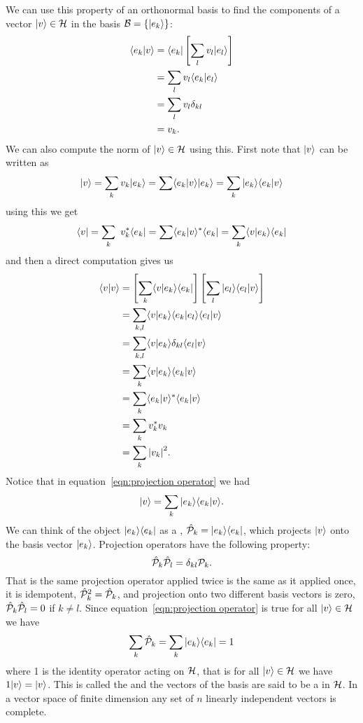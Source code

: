     We can use this property of an orthonormal basis to find the components of a vector \(\vert {v} \rangle\in\mathcal{H}\) in the basis \(\mathcal{B} = \{\vert {e_k} \rangle\}\):
    \begin{align*}
        \langle {e_k} \vert {v} \rangle &= \langle {e_k} \vert\left[\sum_l v_l\vert {e_l} \rangle\right]\\
        &= \sum_l v_l\langle {e_k} \vert {e_l} \rangle\\
        &= \sum_l v_l\delta_{kl}\\
        &= v_k.
    \end{align*}
    We can also compute the norm of \(\vert {v} \rangle\in\mathcal{H}\) using this.
    First note that \(\vert {v} \rangle\) can be written as
    \begin{equation}\label{eqn:projection operator}
        \vert {v} \rangle = \sum_k v_k \vert {e_k} \rangle = \sum \langle {e_k} \vert {v} \rangle\vert {e_k} \rangle = \sum_k \vert {e_k} \rangle\langle {e_k} \vert {v} \rangle
    \end{equation}
    using this we get
    \[\langle {v} \vert = \sum_k\ v_k^*\langle {e_k} \vert = \sum \langle {e_k} \vert {v} \rangle^*\langle {e_k} \vert = \sum_k \langle {v} \vert {e_k} \rangle\langle {e_k} \vert\]
    and then a direct computation gives us
    \begin{align*}
        \langle {v} \vert {v} \rangle &= \left[\sum_k \langle {v} \vert {e_k} \rangle\langle {e_k} \vert\right]\left[\sum_l \vert {e_l} \rangle\langle {e_l} \vert {v} \rangle\right]\\
        &= \sum_{k, l}\langle {v} \vert {e_k} \rangle\langle {e_k} \vert {e_l} \rangle\langle {e_l} \vert {v} \rangle\\
        &= \sum_{k, l}\langle {v} \vert {e_k} \rangle\delta_{kl}\langle {e_l} \vert {v} \rangle\\
        &= \sum_k \langle {v} \vert {e_k} \rangle\langle {e_k} \vert {v} \rangle\\
        &= \sum_k \langle {e_k} \vert {v} \rangle^*\langle {e_k} \vert {v} \rangle\\
        &= \sum_k v_k^*v_k\\
        &= \sum_k \abs{v_k}^2.
    \end{align*}
    Notice that in equation~\ref{eqn:projection operator} we had
    \[\vert {v} \rangle = \sum_k\vert {e_k} \rangle\langle {e_k} \vert {v} \rangle.\]
    We can think of the object \(\vert {e_k}\rangle\langle {e_k} \vert\) as a , \(\hat{\mathcal{P}}_k = \vert {e_k}\rangle\langle {e_k} \vert\), which projects \(\vert {v} \rangle\) onto the basis vector \(\vert {e_k} \rangle\).
    Projection operators have the following property:
    \[\hat{\mathcal{P}}_k\hat{\mathcal{P}}_l = \delta_{kl}\mathcal{P}_k.\]
    That is the same projection operator applied twice is the same as it applied once, it is idempotent, \(\hat{\mathcal{P}}_k^2 = \hat{\mathcal{P}}_k\), and projection onto two different basis vectors is zero, \(\hat{\mathcal{P}}_k\hat{\mathcal{P}}_l = 0\) if \(k \ne l\).
    Since equation~\ref{eqn:projection operator} is true for all \(\vert {v} \rangle\in\mathcal{H}\) we have
    \[\sum_k \hat{\mathcal{P}}_k = \sum_k \vert {e_k}\rangle\langle {e_k} \vert = 1\]
    where 1 is the identity operator acting on \(\mathcal{H}\), that is for all \(\vert {v} \rangle\in\mathcal{H}\) we have \(1\vert {v} \rangle = \vert {v} \rangle\).
    This is called the  and the vectors of the basis are said to be a  in \(\mathcal{H}\).
    In a vector space of finite dimension any set of \(n\) linearly independent vectors is complete.
    
